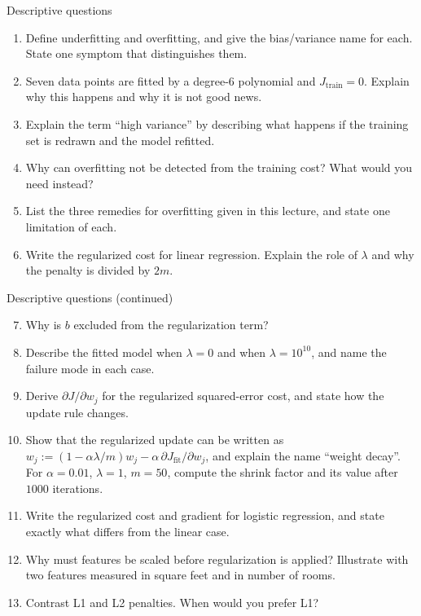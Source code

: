 \documentclass[aspectratio=169,10pt]{beamer}
\begin{document}
\begin{frame}{Descriptive questions}
  \footnotesize
  \begin{enumerate}
    \item Define underfitting and overfitting, and give the bias/variance name for each.
          State one symptom that distinguishes them. \hfill{}
    \item Seven data points are fitted by a degree-$6$ polynomial and $J_{\text{train}}=0$.
          Explain why this happens and why it is not good news. \hfill{}
    \item Explain the term ``high variance'' by describing what happens if the training set
          is redrawn and the model refitted. \hfill{}
    \item Why can overfitting not be detected from the training cost? What would you need
          instead? \hfill{}
    \item List the three remedies for overfitting given in this lecture, and state one
          limitation of each. \hfill{}
    \item Write the regularized cost for linear regression. Explain the role of $\lambda$ and
          why the penalty is divided by $2m$. \hfill{}
  \end{enumerate}
\end{frame}

\begin{frame}{Descriptive questions (continued)}
  \footnotesize
  \begin{enumerate}\setcounter{enumi}{6}
    \item Why is $b$ excluded from the regularization term? \hfill{}
    \item Describe the fitted model when $\lambda=0$ and when $\lambda=10^{10}$, and name the
          failure mode in each case. \hfill{}
    \item Derive $\partial J/\partial w_j$ for the regularized squared-error cost, and state
          how the update rule changes. \hfill{}
    \item Show that the regularized update can be written as
          $w_j := (1-\alpha\lambda/m)w_j - \alpha\,\partial J_{\text{fit}}/\partial w_j$, and
          explain the name ``weight decay''. For $\alpha=0.01$, $\lambda=1$, $m=50$, compute
          the shrink factor and its value after $1000$ iterations. \hfill{}
    \item Write the regularized cost and gradient for logistic regression, and state exactly
          what differs from the linear case. \hfill{}
    \item Why must features be scaled before regularization is applied? Illustrate with two
          features measured in square feet and in number of rooms. \hfill{}
    \item Contrast L1 and L2 penalties. When would you prefer L1? \hfill{}
  \end{enumerate}
\end{frame}
\end{document}
